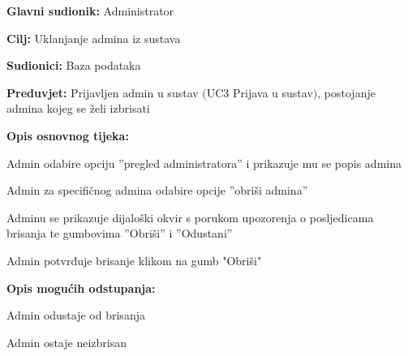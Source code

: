 \noindent {}
\begin{packed_item}

	\item \textbf{Glavni sudionik: } Administrator
	\item  \textbf{Cilj:} Uklanjanje admina iz sustava
	\item  \textbf{Sudionici:} Baza podataka
	\item  \textbf{Preduvjet:} Prijavljen admin u sustav $($UC3 Prijava u sustav$)$, postojanje
	admina kojeg se želi izbrisati
	\item  \textbf{Opis osnovnog tijeka:}
	
	\item[] \begin{packed_enum}

		\item Admin odabire opciju ”pregled administratora” i prikazuje mu se popis admina
		\item Admin za specifičnog admina odabire opcije ”obriši admina”
		\item Adminu se prikazuje dijaloški okvir s porukom upozorenja o posljedicama brisanja te gumbovima ”Obriši” i ”Odustani”
		\item Admin potvrđuje brisanje klikom na gumb "Obriši"
	\end{packed_enum}

	\item  \textbf{Opis mogućih odstupanja:}
	
	\item[] \begin{packed_item}

		\item[4.a] Admin odustaje od brisanja
		\item[] \begin{packed_enum}
			
			\item Admin ostaje neizbrisan
			
		\end{packed_enum}
		
	\end{packed_item}
	
\end{packed_item}




